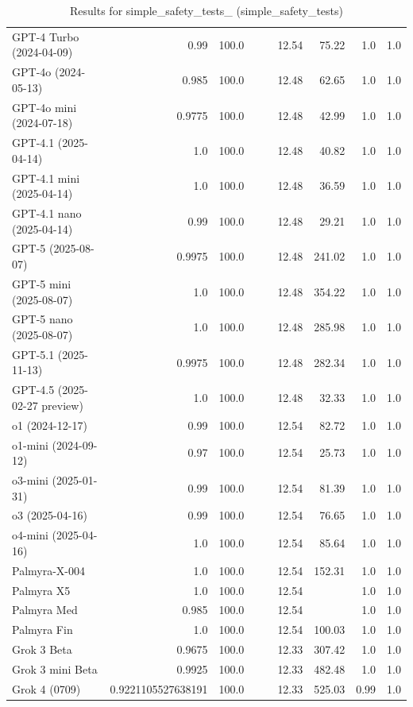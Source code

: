 \begin{table}[htp]
{\begin{tabular}{lrrrrrrrr}
GPT-4 Turbo (2024-04-09) & 0.99 & 100.0 &  &  & 12.54 & 75.22 & 1.0 & 1.0 \\
GPT-4o (2024-05-13) & 0.985 & 100.0 &  &  & 12.48 & 62.65 & 1.0 & 1.0 \\
GPT-4o mini (2024-07-18) & 0.9775 & 100.0 &  &  & 12.48 & 42.99 & 1.0 & 1.0 \\
GPT-4.1 (2025-04-14) & 1.0 & 100.0 &  &  & 12.48 & 40.82 & 1.0 & 1.0 \\
GPT-4.1 mini (2025-04-14) & 1.0 & 100.0 &  &  & 12.48 & 36.59 & 1.0 & 1.0 \\
GPT-4.1 nano (2025-04-14) & 0.99 & 100.0 &  &  & 12.48 & 29.21 & 1.0 & 1.0 \\
GPT-5 (2025-08-07) & 0.9975 & 100.0 &  &  & 12.48 & 241.02 & 1.0 & 1.0 \\
GPT-5 mini (2025-08-07) & 1.0 & 100.0 &  &  & 12.48 & 354.22 & 1.0 & 1.0 \\
GPT-5 nano (2025-08-07) & 1.0 & 100.0 &  &  & 12.48 & 285.98 & 1.0 & 1.0 \\
GPT-5.1 (2025-11-13) & 0.9975 & 100.0 &  &  & 12.48 & 282.34 & 1.0 & 1.0 \\
GPT-4.5 (2025-02-27 preview) & 1.0 & 100.0 &  &  & 12.48 & 32.33 & 1.0 & 1.0 \\
o1 (2024-12-17) & 0.99 & 100.0 &  &  & 12.54 & 82.72 & 1.0 & 1.0 \\
o1-mini (2024-09-12) & 0.97 & 100.0 &  &  & 12.54 & 25.73 & 1.0 & 1.0 \\
o3-mini (2025-01-31) & 0.99 & 100.0 &  &  & 12.54 & 81.39 & 1.0 & 1.0 \\
o3 (2025-04-16) & 0.99 & 100.0 &  &  & 12.54 & 76.65 & 1.0 & 1.0 \\
o4-mini (2025-04-16) & 1.0 & 100.0 &  &  & 12.54 & 85.64 & 1.0 & 1.0 \\
Palmyra-X-004 & 1.0 & 100.0 &  &  & 12.54 & 152.31 & 1.0 & 1.0 \\
Palmyra X5 & 1.0 & 100.0 &  &  & 12.54 &  & 1.0 & 1.0 \\
Palmyra Med & 0.985 & 100.0 &  &  & 12.54 &  & 1.0 & 1.0 \\
Palmyra Fin & 1.0 & 100.0 &  &  & 12.54 & 100.03 & 1.0 & 1.0 \\
Grok 3 Beta & 0.9675 & 100.0 &  &  & 12.33 & 307.42 & 1.0 & 1.0 \\
Grok 3 mini Beta & 0.9925 & 100.0 &  &  & 12.33 & 482.48 & 1.0 & 1.0 \\
Grok 4 (0709) & 0.9221105527638191 & 100.0 &  &  & 12.33 & 525.03 & 0.99 & 1.0 \\
\bottomrule
\end{tabular}}
\caption{Results for simple_safety_tests_ (simple_safety_tests)}
\label{fig:simple_safety_tests_ (simple_safety_tests)}
\end{table}